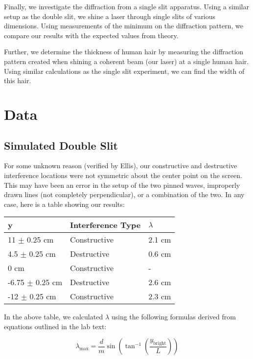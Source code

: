 \documentclass[12pt]{article}
\begin{document}
Finally, we investigate the diffraction from a single slit
apparatus. Using a similar setup as the double slit, we shine a laser
through single slits of various dimensions. Using measurements of the
minimum on the diffraction pattern, we compare our results with the
expected values from theory.

Further, we determine the thickness of human hair by measuring the
diffraction pattern created when shining a coherent beam (our laser)
at a single human hair. Using similar calculations as the single slit
experiment, we can find the width of this hair.

\section*{Data}

\subsection*{Simulated Double Slit}
For some unknown reason (verified by Ellis), our constructive and
destructive interference locations were not symmetric about the center
point on the screen. This may have been an error in the setup of the
two pinned waves, improperly drawn lines (not completely
perpendicular), or a combination of the two. In any case, here is a
table showing our results:

\begin{center}
  \begin{tabular}{|l|l|l|}
    \hline
    y & Interference Type & $\lambda$ \\
    \hline
    11 $\pm$ 0.25 cm & Constructive & 2.1 cm\\
    4.5 $\pm$ 0.25 cm & Destructive & 0.6 cm\\
    0 cm & Constructive & -\\
    -6.75 $\pm$ 0.25 cm & Destructive & 2.6 cm\\
    -12 $\pm$ 0.25 cm & Constructive & 2.3 cm\\
    \hline
  \end{tabular}
\end{center}

In the above table, we calculated $\lambda$ using the following
formulas derived from equations outlined in the lab text:

\begin{center}
  \begin{equation*}
    \lambda_{\mathrm{max}} = \frac{d}{m} \sin \left( \tan^{-1} \left( \frac{y_{\mathrm{bright}}}{L} \right) \right)
  \end{equation*}
\end{center}
\end{document}
